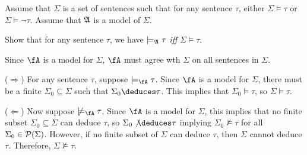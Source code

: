 \begin{problem}[8]
  Assume that $\Sigma$ is a set of sentences such that for any
  sentence $\tau$, either $\Sigma \models \tau$ or $\Sigma \models \lnot \tau$.
  Assume that $\mathfrak{A}$ is a model of $\Sigma$.
  
  \step
  Show that for any sentence $\tau$, we have $\models_{\mathfrak{A}} \tau$
  \emph{iff} $\Sigma \models \tau$.
\end{problem}
\begin{Answer}
  Since $\fA$ is a model for $\Sigma$, $\fA$ must agree wth $\Sigma$
  on all sentences in $\Sigma$.

  \bigskip
  \step
  ($\Rightarrow$)
  For any sentence $\tau$, suppose $\models_{\fA} \tau$.
  Since $\fA$ is a model for $\Sigma$,
  there must be a finite $\Sigma_0 \subseteq \Sigma$ such that
  $\Sigma_0 \deduces \tau$.
  This implies that $\Sigma_0 \models \tau$,
  so $\Sigma \models \tau$.

  \bigskip
  \step
  ($\Leftarrow$)
  Now suppose $\not \models_{\fA} \tau$.
  Since $\fA$ is a model for $\Sigma$,
  this implies that no finite subset $\Sigma_0 \subseteq \Sigma$ can deduce $\tau$,
  so $\Sigma_0 \not \deduces \tau$ implying $\Sigma_0 \not \models \tau$
  for all $\Sigma_0 \in \mathcal{P}(\Sigma)$.
  However, if no finite subset of $\Sigma$ can deduce $\tau$,
  then $\Sigma$ cannot deduce $\tau$. Therefore, $\Sigma \not \models \tau$.

\end{Answer}
